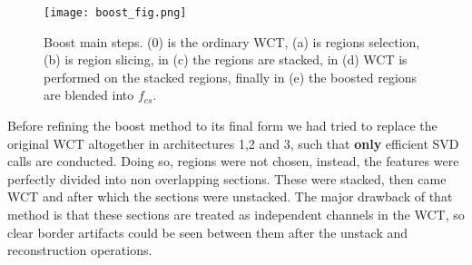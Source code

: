 \begin{figure}[h!]
	\centering
	\texttt{[image: boost\_fig.png]}
	\caption{Boost main steps. (0) is the ordinary WCT, (a) is regions selection, (b) is region slicing, in (c) the regions are stacked, in (d) WCT is performed on the stacked regions, finally in (e) the boosted regions are blended into $f_{cs}$.}
	\label{fig:boost}
\end{figure}

Before refining the boost method to its final form we had tried to replace the original WCT altogether in architectures 1,2 and 3, such that \textbf{only} efficient SVD calls are conducted. Doing so, regions were not chosen, instead, the features were perfectly divided into non overlapping sections. These were stacked, then came WCT and after which the sections were unstacked. The major drawback of that method is that these sections are treated as independent channels in the WCT, so clear border artifacts could be seen between them after the unstack and reconstruction operations.

